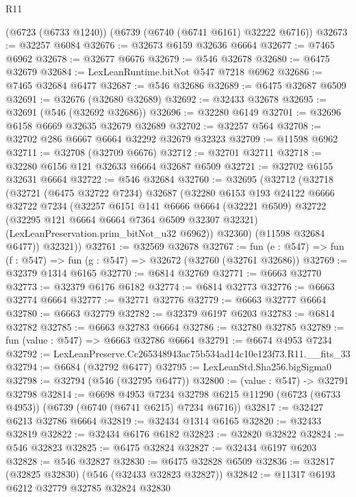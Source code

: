 \begin{lexlean}{R11}
\begin{coremodule}
    (@6723 (@6733 @1240))
    (@6739 (@6740 (@6741 @6161) @32222 @6716))
@32673 := @32257 @6084
@32676 := @32673 @6159 @32636 @6664
@32677 := @7465 @6962
@32678 := @32677 @6676
@32679 := @546 @32678
@32680 := @6475 @32679
@32684 := LexLeanRuntime.bitNot @547 @7218 @6962
@32686 := @7465 @32684 @6477
@32687 := @546 @32686
@32689 := @6475 @32687 @6509
@32691 := @32676 (@32680 @32689)
@32692 := @32433 @32678
@32695 := @32691 (@546 (@32692 @32686))
@32696 := @32280 @6149
@32701 := @32696 @6158 @6669 @32635 @32679 @32689
@32702 := @32257 @564
@32708 := @32702 @286 @6667 @6664 @32292 @32679 @32323
@32709 := @11598 @6962
@32711 := @32708 (@32709 @6676)
@32712 := @32701 @32711
@32718 := @32280 @6156 @121 @32633 @6664 @32687 @6509
@32721 := @32702 @6155 @32631 @6664
@32722 := @546 @32684
@32760 := @32695
    (@32712
      (@32718
        (@32721
          (@6475 @32722 @7234)
          @32687
          (@32280
            @6153
            @193
            @24122
            @6666
            @32722
            @7234
            (@32257
              @6151
              @141
              @6666
              @6664
              (@32221 @6509)
              @32722
              (@32295 @121 @6664 @6664 @7364 @6509 @32307 @32321)
              (LexLeanPreservation.prim_bitNot_u32 @6962))
            @32360)
          (@11598 @32684 @6477))
        @32321))
@32761 := @32569 @32678
@32767 := fun (e : @547) => fun (f : @547) => fun (g : @547) => @32672 (@32760 (@32761 @32686))
@32769 := @32379 @1314 @6165
@32770 := @6814 @32769
@32771 := @6663 @32770
@32773 := @32379 @6176 @6182
@32774 := @6814 @32773
@32776 := @6663 @32774 @6664
@32777 := @32771 @32776
@32779 := @6663 @32777 @6664
@32780 := @6663 @32779
@32782 := @32379 @6197 @6203
@32783 := @6814 @32782
@32785 := @6663 @32783 @6664
@32786 := @32780 @32785
@32789 := fun (value : @547) => @6663 @32786 @6664
@32791 := @6674 @4953 @7234
@32792 := LexLeanPreserve.Cc265348943ac75b534ad14c10e123f73.R11.__fits_33
@32794 := @6684 (@32792 @6477)
@32795 := LexLeanStd.Sha256.bigSigma0
@32798 := @32794 (@546 (@32795 @6477))
@32800 := (value : @547) -> @32791 @32798
@32814 := @6698
    @4953
    @7234
    @32798
    @6215
    @11290
    (@6723 (@6733 @4953))
    (@6739 (@6740 (@6741 @6215) @7234 @6716))
@32817 := @32427 @6213 @32786 @6664
@32819 := @32434 @1314 @6165
@32820 := @32433 @32819
@32822 := @32434 @6176 @6182
@32823 := @32820 @32822
@32824 := @546 @32823
@32825 := @6475 @32824
@32827 := @32434 @6197 @6203
@32828 := @546 @32827
@32830 := @6475 @32828 @6509
@32836 := @32817 (@32825 @32830) (@546 (@32433 @32823 @32827))
@32842 := @11317 @6193 @6212 @32779 @32785 @32824 @32830

\end{coremodule}
\end{lexlean}
